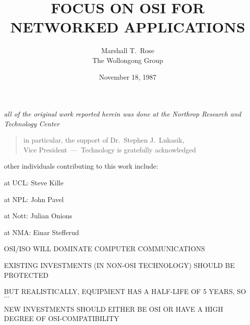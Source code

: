

\raggedright





\title	{FOCUS ON OSI FOR\\ NETWORKED APPLICATIONS}
\author	{Marshall T.~Rose\\ The Wollongong Group}
\date	{November 18, 1987}
\maketitlepage


\begin{note}\em
all of the original work reported herein was done at the Northrop Research
and Technology Center
\begin{quote}
in particular, the support of Dr.~Stephen J.~Lukasik,\\
Vice President~---~Technology is gratefully acknowledged
\end{quote}

other individuals contributing to this work include:
\begin{nrtc}\em
\item	at UCL: Steve Kille

\item	at NPL: John Pavel

\item	at Nott: Julian Onions

\item	at NMA: Einar Stefferud
\end{nrtc}
\end{note}


\begin{bwslide}

\begin{nrtc}
\item	OSI/ISO WILL DOMINATE COMPUTER COMMUNICATIONS

\item	EXISTING INVESTMENTS (IN NON-OSI TECHNOLOGY) SHOULD BE PROTECTED

\item	BUT REALISTICALLY, EQUIPMENT HAS A HALF-LIFE OF 5 YEARS, SO$\ldots$

\item	NEW INVESTMENTS SHOULD EITHER BE OSI OR HAVE A HIGH DEGREE OF
	OSI-COMPATIBILITY
\end{nrtc}
\end{bwslide}


